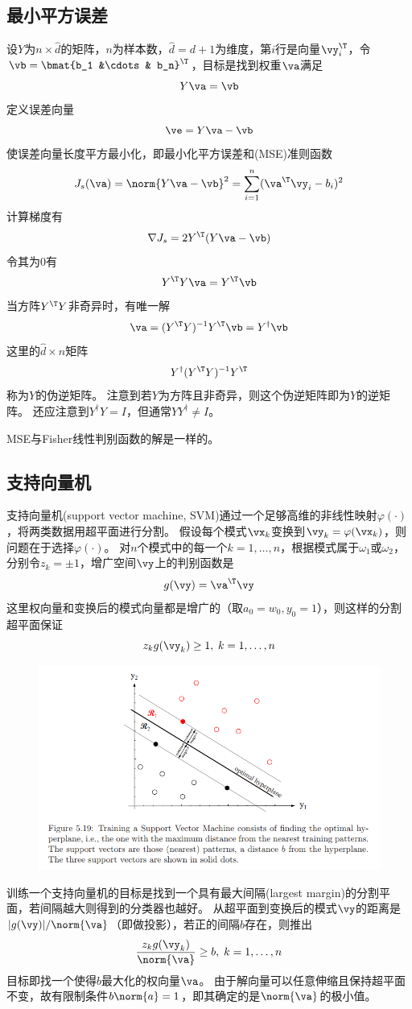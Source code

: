 \subsection{最小平方误差}
设$Y$为$n\times\hat{d}$的矩阵，$n$为样本数，$\hat{d}=d+1$为维度，第$i$行是向量$\vy_i^\T$，令$\vb=\bmat{b_1 &\cdots & b_n}^\T$，目标是找到权重$\va$满足
\[Y\va=\vb\]
定义误差向量
\[\ve=Y\va-\vb\]
使误差向量长度平方最小化，即最小化平方误差和(MSE)准则函数
\[J_s(\va)=\norm{Y\va-\vb}^2=\sum_{i=1}^n(\va^\T\vy_i-b_i)^2\]
计算梯度有
\[\nabla J_s=2Y^\T(Y\va-\vb)\]
令其为$0$有
\[Y^\T Y\va=Y^\T\vb\]
当方阵$Y^\T Y$非奇异时，有唯一解
\[\va=(Y^\T Y)^{-1} Y^\T\vb=Y^\dag\vb\]
这里的$\hat{d}\times n$矩阵
\[Y^\dag (Y^\T Y)^{-1} Y^\T\]
称为$Y$的伪逆矩阵。
注意到若$Y$为方阵且非奇异，则这个伪逆矩阵即为$Y$的逆矩阵。
还应注意到$Y^\dag Y=I$，但通常$YY^\dag\ne I$。

MSE与Fisher线性判别函数的解是一样的。

\subsection{支持向量机}
支持向量机(support vector machine, SVM)通过一个足够高维的非线性映射$\varphi(\cdot)$，将两类数据用超平面进行分割。
假设每个模式$\vx_k$变换到$\vy_k=\varphi(\vx_k)$，则问题在于选择$\varphi(\cdot)$。
对$n$个模式中的每一个$k=1,\ldots,n$，根据模式属于$\omega_1$或$\omega_2$，分别令$z_k=\pm 1$，增广空间$\vy$上的判别函数是
\[g(\vy)=\va^\T\vy\]
这里权向量和变换后的模式向量都是增广的（取$a_0=w_0,y_0=1$），则这样的分割超平面保证
\[z_kg(\vy_k)\geq 1,\;k=1,\ldots,n\]
\begin{figure}[H]
\centering
\includegraphics[width=0.9\linewidth]{fig/SVM.png}
\end{figure}

训练一个支持向量机的目标是找到一个具有最大间隔(largest margin)的分割平面，若间隔越大则得到的分类器也越好。
从超平面到变换后的模式$\vy$的距离是$|g(\vy)|/\norm{\va}$（即做投影），若正的间隔$b$存在，则推出
\[\frac{z_kg(\vy_k)}{\norm{\va}}\geq b,\;k=1,\ldots,n\]
目标即找一个使得$b$最大化的权向量$\va$。
由于解向量可以任意伸缩且保持超平面不变，故有限制条件$b\norm{a}=1$，即其确定的是$\norm{\va}$的极小值。

